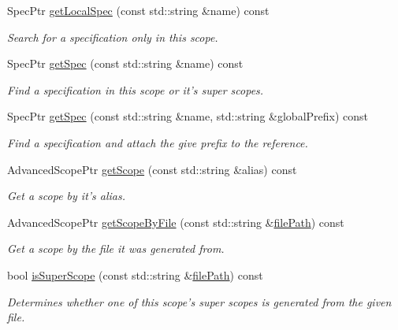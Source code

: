 \begin{DoxyCompactItemize}
Spec\-Ptr \hyperlink{classgiskard__suturo_1_1AdvancedScope_a6e4525139ff040d42a073643bb0ab483}{get\-Local\-Spec} (const std\-::string \&name) const 
\begin{DoxyCompactList}\small\item\em Search for a specification only in this scope. \end{DoxyCompactList}\item 
Spec\-Ptr \hyperlink{classgiskard__suturo_1_1AdvancedScope_ab44fac23fb71135abd66b65a5053a3ee}{get\-Spec} (const std\-::string \&name) const 
\begin{DoxyCompactList}\small\item\em Find a specification in this scope or it's super scopes. \end{DoxyCompactList}\item 
Spec\-Ptr \hyperlink{classgiskard__suturo_1_1AdvancedScope_a0381a9d28f74e2ce9101e65ea280e05b}{get\-Spec} (const std\-::string \&name, std\-::string \&global\-Prefix) const 
\begin{DoxyCompactList}\small\item\em Find a specification and attach the give prefix to the reference. \end{DoxyCompactList}\item 
Advanced\-Scope\-Ptr \hyperlink{classgiskard__suturo_1_1AdvancedScope_a21718dbd064b203878bea71ed38e41c0}{get\-Scope} (const std\-::string \&alias) const 
\begin{DoxyCompactList}\small\item\em Get a scope by it's alias. \end{DoxyCompactList}\item 
Advanced\-Scope\-Ptr \hyperlink{classgiskard__suturo_1_1AdvancedScope_a7489f59d843c5ae6cd0849b7bfd08579}{get\-Scope\-By\-File} (const std\-::string \&\hyperlink{classgiskard__suturo_1_1AdvancedScope_a2b3e583a28325902fec73e0063646cab}{file\-Path}) const 
\begin{DoxyCompactList}\small\item\em Get a scope by the file it was generated from. \end{DoxyCompactList}\item 
bool \hyperlink{classgiskard__suturo_1_1AdvancedScope_a96cdc688a623cf277ea441533813e16b}{is\-Super\-Scope} (const std\-::string \&\hyperlink{classgiskard__suturo_1_1AdvancedScope_a2b3e583a28325902fec73e0063646cab}{file\-Path}) const 
\begin{DoxyCompactList}\small\item\em Determines whether one of this scope's super scopes is generated from the given file. \end{DoxyCompactList}\item 

\end{DoxyCompactItemize}
